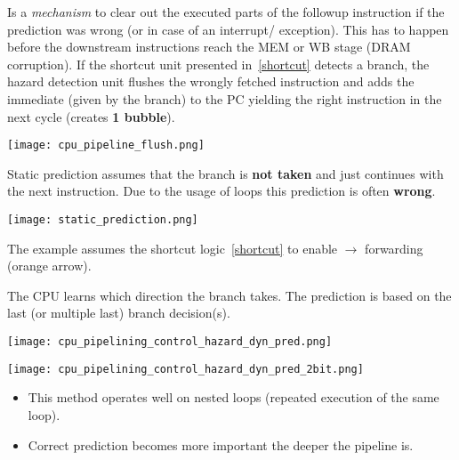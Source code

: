 \newpar{}

Is a \textit{mechanism} to clear out the executed parts of the followup instruction if the prediction was wrong (or in case of an interrupt/ exception). This has to happen before the downstream instructions reach the MEM or WB stage (DRAM corruption). If the shortcut unit presented in~\ref{shortcut} detects a branch, the hazard detection unit flushes the wrongly fetched instruction and adds the immediate (given by the branch) to the PC yielding the right instruction in the next cycle (creates \textbf{1 bubble}).
\begin{center}
    \texttt{[image: cpu\_pipeline\_flush.png]}
\end{center}
\newpar{}

Static prediction assumes that the branch is \textbf{not taken} and just continues with the next instruction. Due to the usage of loops this prediction is often \textbf{wrong}.
\begin{center}
    \texttt{[image: static\_prediction.png]}
\end{center}
The example assumes the shortcut logic~\ref{shortcut} to enable $\to$ forwarding (orange arrow).

\newpar{}

The CPU learns which direction the branch takes. The prediction is based on the last (or multiple last) branch decision(s). %
\begin{center}
    \texttt{[image: cpu\_pipelining\_control\_hazard\_dyn\_pred.png]}
\end{center}

\newpar{}
\begin{center}
    \texttt{[image: cpu\_pipelining\_control\_hazard\_dyn\_pred\_2bit.png]}
\end{center}

\begin{itemize}
    \item This method operates well on nested loops (repeated execution of the same loop).
    \item Correct prediction becomes more important the deeper the pipeline is.
\end{itemize}


